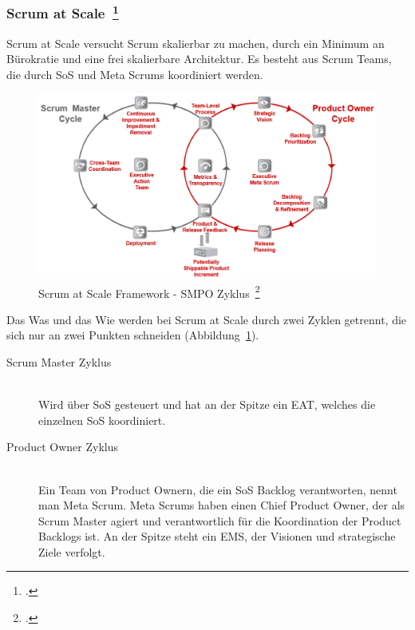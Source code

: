 \clearpage
\subsubsection[Scrum at Scale]{Scrum at Scale~\footcite[vgl.][]{scale}}

Scrum at Scale versucht Scrum skalierbar zu machen, durch ein Minimum an Bürokratie und eine frei skalierbare Architektur.
Es besteht aus Scrum Teams, die durch \ac{SoS} und Meta Scrums koordiniert werden. 
\begin{savenotes}
  \begin{figure}[H] 
    \centering
       \includegraphics[width=1.0\textwidth]{img/scrumatscale.png}
    \caption[Scrum at Scale Framework {-} SMPO Zyklus]{Scrum at Scale Framework {-} SMPO Zyklus~\footcite{scrumatscale_framework}}\label{fig:sas}
  \end{figure}
\end{savenotes}

Das Was und das Wie werden bei Scrum at Scale durch zwei Zyklen getrennt, die sich nur an zwei Punkten schneiden (Abbildung~\ref{fig:sas}).
\begin{description}
  \item[Scrum Master Zyklus] \hfill \\ Wird über \ac{SoS} gesteuert und hat an der Spitze ein \ac{EAT}, welches die einzelnen \ac{SoS} koordiniert.
  \item[Product Owner Zyklus] \hfill \\ Ein Team von Product Ownern, die ein \ac{SoS} Backlog verantworten, nennt man Meta Scrum. Meta Scrums haben einen Chief Product Owner, der als Scrum Master agiert und verantwortlich für die Koordination der Product Backlogs ist. An der Spitze steht ein \ac{EMS}, der Visionen und strategische Ziele verfolgt.
\end{description}

